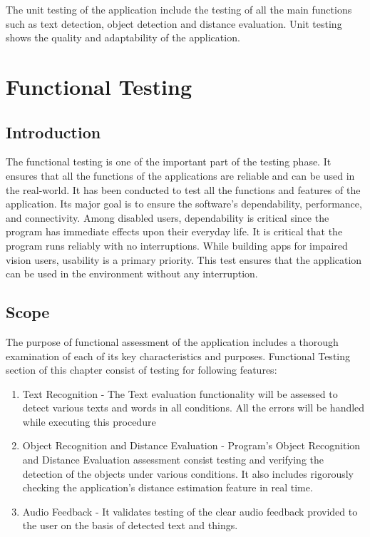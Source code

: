 \documentclass[MScCS]{uccthesis}
\begin{document}
The unit testing of the application include the testing of all the main functions such as text detection, object detection and distance evaluation. Unit testing shows the quality and adaptability of the application.


\section{Functional Testing}
\subsection{Introduction}
The functional testing is one of the important part of the testing phase. It ensures that all the functions of the applications are reliable and can be used in the real-world. It has been conducted to test all the functions and features of the application. Its major goal is to ensure the software's dependability, performance, and connectivity. Among disabled users, dependability is critical since the program has immediate effects upon their everyday life. It is critical that the program runs reliably with no interruptions. While building apps for impaired vision users, usability is a primary priority. This test ensures that the application can be used in the environment without any interruption.

\subsection{Scope}
The purpose of functional assessment of the application includes a thorough examination of each of its key characteristics and purposes.
Functional Testing section of this chapter consist of testing for following features:
\begin{enumerate}
    \item Text Recognition - The Text evaluation functionality will be assessed to detect various texts and words in all conditions. All the errors will be handled while executing this procedure
    \item Object Recognition and Distance Evaluation - Program's Object Recognition and Distance Evaluation assessment consist testing and verifying the detection of the objects under various conditions. It also includes rigorously checking the application's distance estimation feature in real time.
    \item Audio Feedback - It validates testing of the clear audio feedback provided to the user on the basis of detected text and things. 
\end{enumerate}
\end{document}
